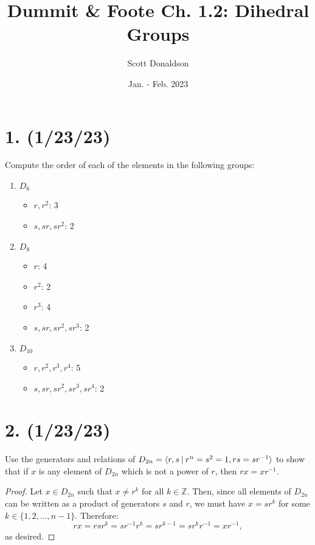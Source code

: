 \documentclass{article}
\title{Dummit \& Foote Ch. 1.2: Dihedral Groups}
\author{Scott Donaldson}
\date{Jan. - Feb. 2023}
\begin{document}
\maketitle

\section*{1. (1/23/23)}

Compute the order of each of the elements in the following groups:

\begin{enumerate}[label=(\alph*)]
    \item $D_6$
        \begin{itemize}
            \item $r, r^2$: 3
            \item $s, sr, sr^2$: 2
        \end{itemize}
    
    \item $D_8$
        \begin{itemize}
            \item $r$: 4
            \item $r^2$: 2
            \item $r^3$: 4
            \item $s, sr, sr^2, sr^3$: 2
        \end{itemize}

    \item $D_{10}$
        \begin{itemize}
            \item $r, r^2, r^3, r^4$: 5
            \item $s, sr, sr^2, sr^3, sr^4$: 2
        \end{itemize}
    
\end{enumerate}

\section*{2. (1/23/23)}

Use the generators and relations of $D_{2n} = \langle r, s\hspace{0.5ex}|\hspace{0.5ex} r^n = s^2 = 1, rs = sr^{-1} \rangle$ to show that if $x$ is any element of $D_{2n}$ which is not a power of $r$, then $rx = xr^{-1}$. 

\begin{proof}
    Let $x \in D_{2n}$ such that $x \neq r^k$ for all $k \in \mathbb{Z}$. Then, since all elements of $D_{2n}$ can be written as a product of generators $s$ and $r$, we must have $x = sr^k$ for some $k \in \{ 1, 2, ..., n - 1 \}$. Therefore:
    \begin{equation*}
        rx = rsr^k = sr^{-1} r^k = sr^{k - 1} = sr^k r^{-1} = x r^{-1},
    \end{equation*}
    as desired.
\end{proof}
\end{document}
